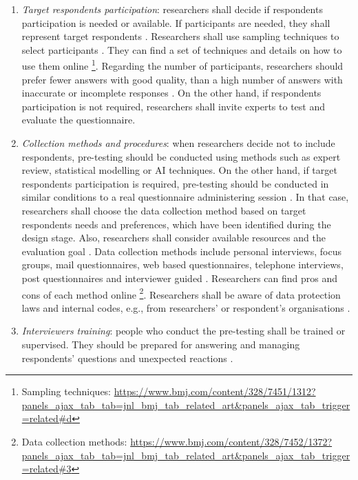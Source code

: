 \begin{enumerate}
    \item \emph{Target respondents participation}: researchers shall decide if respondents participation is needed or available. If participants are needed, they shall represent target respondents \cite{Krosnick2009,Boynton2004}.
    Researchers shall use sampling techniques to select participants \cite{Boynton2004c,Diem,Radhakrishna2007}. They can find a set of techniques and details on how to use them online \footnote{Sampling techniques: \url{https://www.bmj.com/content/328/7451/1312?panels_ajax_tab_tab=jnl_bmj_tab_related_art&panels_ajax_tab_trigger=related\#d}}.
    Regarding the number of participants, researchers should prefer fewer answers with good quality, than a high number of answers with inaccurate or incomplete responses \cite{Boynton2004}. On the other hand, if respondents participation is not required, researchers shall invite experts to test and evaluate the questionnaire.
    
    \item \emph{Collection methods and procedures}: when researchers decide not to include respondents, pre-testing should be conducted using methods such as expert review, statistical modelling or \ac{AI} techniques. On the other hand, if target respondents participation is required, pre-testing should be conducted in similar conditions to a real questionnaire administering session \cite{Krosnick2009}. In that case, researchers shall choose the data collection method based on target respondents needs and preferences, which have been identified during the design stage. Also, researchers shall consider available resources and the evaluation goal \cite{Boynton2004}.
    Data collection methods include personal interviews, focus groups, mail questionnaires, web based questionnaires, telephone interviews, post questionnaires and interviewer guided \cite{Crawford1997,Diem,Boynton2004}. Researchers can find pros and cons of each method online \footnote{Data collection methods: \url{https://www.bmj.com/content/328/7452/1372?panels_ajax_tab_tab=jnl_bmj_tab_related_art&panels_ajax_tab_trigger=related\#3}}.
    Researchers shall be aware of data protection laws and internal codes, e.g., from researchers' or respondent's organisations \cite{Boynton2004}.
    
    \item \emph{Interviewers training}: people who conduct the pre-testing shall be trained or supervised. They should be prepared for answering and managing respondents' questions and unexpected reactions \cite{Boynton2004b}.
\end{enumerate}

